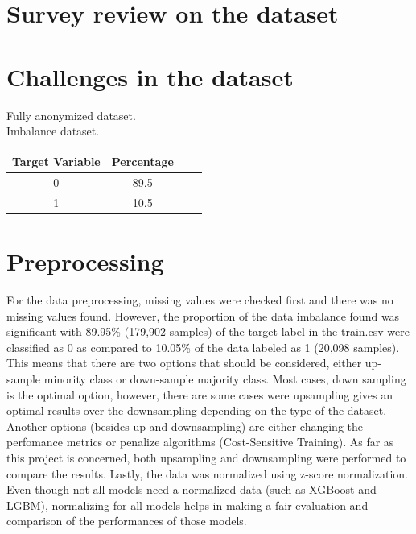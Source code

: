 \documentclass[journal,twoside,web]{ieeecolor}
\begin{document}
\section{Survey review on the dataset}


\section{Challenges in the dataset}
Fully anonymized dataset.\\
Imbalance dataset.




\begin{center}
 \begin{tabular}{||c c c c||} 
 \hline
 Target Variable & Percentage \\ [0.5ex] 
 \hline\hline
 0 & 89.5  \\ 
 \hline
 1 & 10.5 \\[1ex]
 \hline
\end{tabular}
\end{center}







\section{Preprocessing}
For the data preprocessing, missing values were checked first and there was no missing values found. However, the proportion of the data imbalance found was significant with 89.95\% (179,902 samples) of the target label in the train.csv were classified as 0 as compared to 10.05\% of the data labeled as 1 (20,098 samples). This means that there are two options that should be considered, either up-sample minority class or down-sample majority class. Most cases, down sampling is the optimal option, however, there are some cases were upsampling gives an optimal results over the downsampling depending on the type of the dataset. Another options (besides up and downsampling) are either changing the perfomance metrics or penalize algorithms (Cost-Sensitive Training). As far as this project is concerned, both upsampling and downsampling were performed to compare the results. Lastly, the data was normalized using z-score normalization. Even though not all models need a normalized data (such as XGBoost and LGBM), normalizing for all models helps in making a fair evaluation and comparison of the performances of those models. 
\end{document}
